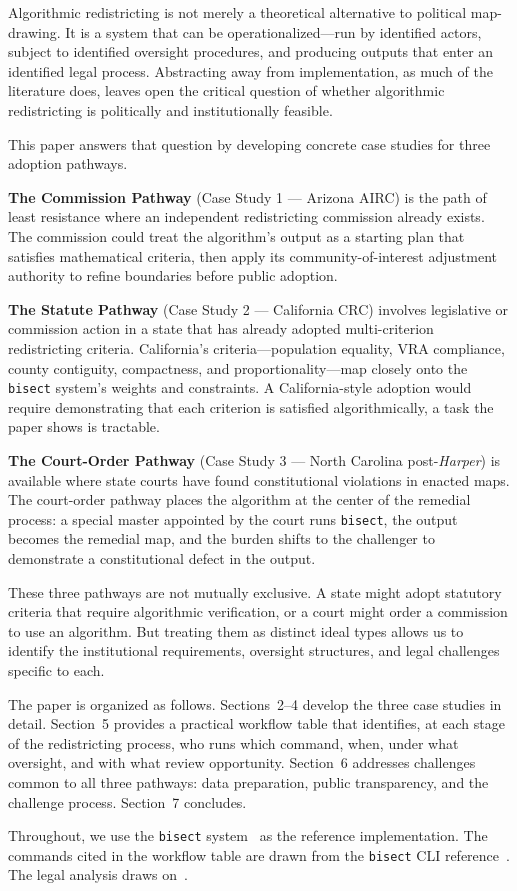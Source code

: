 \label{sec:introduction}

Algorithmic redistricting is not merely a theoretical alternative to
political map-drawing.  It is a system that can be operationalized---run
by identified actors, subject to identified oversight procedures, and
producing outputs that enter an identified legal process.  Abstracting
away from implementation, as much of the literature does, leaves open the
critical question of whether algorithmic redistricting is politically and
institutionally feasible.

This paper answers that question by developing concrete case studies for
three adoption pathways.

\textbf{The Commission Pathway} (Case Study 1 --- Arizona AIRC) is the path
of least resistance where an independent redistricting commission already
exists.  The commission could treat the algorithm's output as a starting
plan that satisfies mathematical criteria, then apply its community-of-interest
adjustment authority to refine boundaries before public adoption.

\textbf{The Statute Pathway} (Case Study 2 --- California CRC) involves
legislative or commission action in a state that has already adopted
multi-criterion redistricting criteria.  California's criteria---population
equality, VRA compliance, county contiguity, compactness, and
proportionality---map closely onto the \texttt{bisect} system's weights and
constraints.  A California-style adoption would require demonstrating that
each criterion is satisfied algorithmically, a task the paper shows is
tractable.

\textbf{The Court-Order Pathway} (Case Study 3 --- North Carolina
post-\textit{Harper}) is available where state courts have found
constitutional violations in enacted maps.  The court-order pathway places
the algorithm at the center of the remedial process: a special master
appointed by the court runs \texttt{bisect}, the output becomes the
remedial map, and the burden shifts to the challenger to demonstrate a
constitutional defect in the output.

These three pathways are not mutually exclusive.  A state might adopt
statutory criteria that require algorithmic verification, or a court might
order a commission to use an algorithm.  But treating them as distinct
ideal types allows us to identify the institutional requirements, oversight
structures, and legal challenges specific to each.

The paper is organized as follows.  Sections~2--4 develop the three case
studies in detail.  Section~5 provides a practical workflow table that
identifies, at each stage of the redistricting process, who runs which
command, when, under what oversight, and with what review opportunity.
Section~6 addresses challenges common to all three pathways: data preparation,
public transparency, and the challenge process.  Section~7 concludes.

Throughout, we use the \texttt{bisect} system~\citep{dellaLibera2026recursive}
as the reference implementation.  The commands cited in the workflow table
are drawn from the \texttt{bisect} CLI reference~\citep{redistCliQuickstart}.
The legal analysis draws on~\citet{dellaLibera2026legal}.
